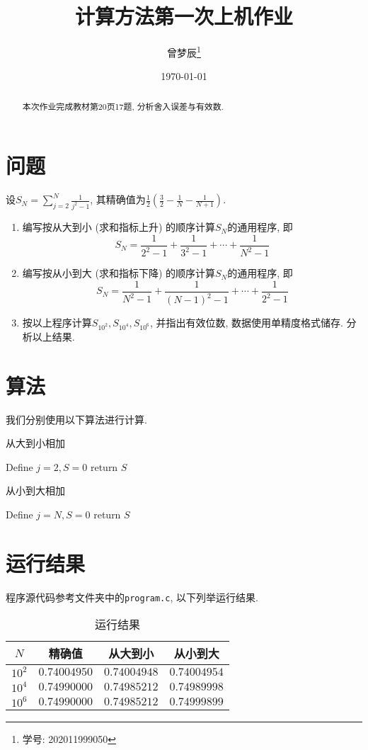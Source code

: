 \documentclass{ctexart}
\title{计算方法第一次上机作业}
\author{曾梦辰\thanks{学号: 202011999050}}
\date{\today}
\begin{document}
\maketitle
\begin{abstract}
    本次作业完成教材第20页17题, 分析舍入误差与有效数.
\end{abstract}

\section{问题}
设$\displaystyle S_N=\sum_{j=2}^N\frac{1}{j^2-1}$, 其精确值为$\displaystyle\frac{1}{2}\left(\frac{3}{2}-\frac{1}{N}-\frac{1}{N+1}\right)$.
\begin{enumerate}[(1)]
    \item 编写按从大到小 (求和指标上升) 的顺序计算$S_N$的通用程序, 即
    \[S_N=\frac{1}{2^2-1}+\frac{1}{3^2-1}+\cdots+\frac{1}{N^2-1}\]
    \item 编写按从小到大 (求和指标下降) 的顺序计算$S_N$的通用程序, 即
    \[S_N=\frac{1}{N^2-1}+\frac{1}{(N-1)^2-1}+\cdots+\frac{1}{2^2-1}\]
    \item 按以上程序计算$S_{10^2},S_{10^4},S_{10^6}$, 并指出有效位数, 数据使用单精度格式储存.
    分析以上结果.
\end{enumerate}
\section{算法}
我们分别使用以下算法进行计算.
\begin{algorithm}
    \caption{从大到小相加}
    Define $j=2,S=0$\;
    return $S$
\end{algorithm}

\begin{algorithm}
    \caption{从小到大相加}
    Define $j=N,S=0$\;
    return $S$
\end{algorithm}


\section{运行结果}
程序源代码参考文件夹中的\verb|program.c|, 以下列举运行结果.
\begin{table}[H]
    \centering
    \begin{tabular}{|c|c|c|c|}
    \hline
    $N$    & 精确值        & 从大到小         & 从小到大         \\ \hline
    $10^2$ & $0.74004950$ & $0.74004948$   & $0.74004954$   \\ \hline
    $10^4$ & $0.74990000$ & $0.74985212$   & $0.74989998$   \\ \hline
    $10^6$ & $0.74990000$ & $0.74985212$   & $0.74999899$   \\ \hline
    \end{tabular}
    \caption{运行结果}
\end{table}
\end{document}
